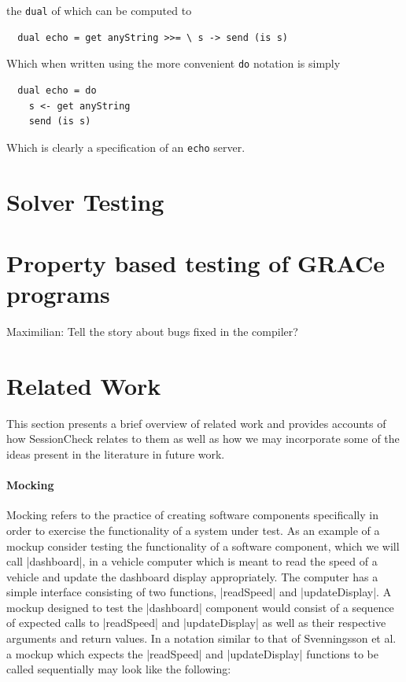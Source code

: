\documentclass{article}
\begin{document}
the \texttt{dual} of which can be computed to

\begin{verbatim}
  dual echo = get anyString >>= \ s -> send (is s)
\end{verbatim}

Which when written using the more convenient \texttt{do} notation is simply

\begin{verbatim}
  dual echo = do
    s <- get anyString
    send (is s)
\end{verbatim}

Which is clearly a specification of an \texttt{echo} server.

\section{Solver Testing}



\section{Property based testing of GRACe programs}

Maximilian: Tell the story about bugs fixed in the compiler?



\section{Related Work}

This section presents a brief overview of related work and provides accounts
of how SessionCheck relates to them as well as how we may incorporate some of
the ideas present in the literature in future work.

\paragraph{Mocking}
Mocking refers to the practice of creating software components specifically
in order to exercise the functionality of a system under test.
%
As an example of a mockup consider testing the functionality of a software
component, which we will call |dashboard|, in a vehicle computer which is
meant to read the speed of a vehicle and update the dashboard display
appropriately.
%
The computer has a simple interface consisting of two functions,
|readSpeed| and |updateDisplay|.
%
A mockup designed to test the |dashboard| component would consist of a sequence
of expected calls to |readSpeed| and |updateDisplay| as well as their
respective arguments and return values.
%
In a notation similar to that of Svenningsson et al. \cite{HughesMocking}
a mockup which expects the |readSpeed| and |updateDisplay| functions to be
called sequentially may look like the following:
%
\end{document}
